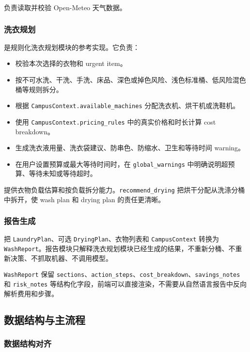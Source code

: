 \documentclass[11pt,a4paper]{ctexart}
\begin{document}
 负责读取并校验 Open-Meteo 天气数据。

\subsubsection{洗衣规划}

 是规则化洗衣规划模块的参考实现。它负责：

\begin{itemize}
  \item 校验本次选择的衣物和 urgent item。
  \item 按不可水洗、干洗、手洗、床品、深色或掉色风险、浅色标准桶、低风险混色桶等规则拆分。
  \item 根据 \texttt{CampusContext.available\_machines} 分配洗衣机、烘干机或洗鞋机。
  \item 使用 \texttt{CampusContext.pricing\_rules} 中的真实价格和时长计算 cost breakdown。
  \item 生成洗衣液用量、洗衣袋建议、防串色、防缩水、卫生和等待时间 warning。
  \item 在用户设置预算或最大等待时间时，在 \texttt{global\_warnings} 中明确说明超预算、等待未知或等待超时。
\end{itemize}

 提供衣物负载估算和按负载拆分能力。\texttt{recommend\_drying} 把烘干分配从洗涤分桶中拆开，使 wash plan 和 drying plan 的责任更清晰。

\subsubsection{报告生成}

 把 \texttt{LaundryPlan}、可选 \texttt{DryingPlan}、衣物列表和 \texttt{CampusContext} 转换为 \texttt{WashReport}。报告模块只解释洗衣规划模块已经生成的结果，不重新分桶、不重新决策、不抓取机器、不调用模型。

\texttt{WashReport} 保留 \texttt{sections}、\texttt{action\_steps}、\texttt{cost\_breakdown}、\texttt{savings\_notes} 和 \texttt{risk\_notes} 等结构化字段，前端可以直接渲染，不需要从自然语言报告中反向解析费用和步骤。

\subsection{数据结构与主流程}

\subsubsection{数据结构对齐}
\end{document}
